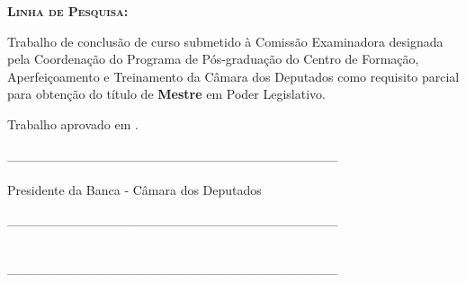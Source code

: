 \begin{folhadeaprovacao}
\begin{minipage}{15.9cm}
\textbf{\textsc{Linha de Pesquisa: }} \imprimirlinhadepesquisa


\vspace{1.2cm}

Trabalho de conclusão de curso submetido à Comissão Examinadora designada pela Coordenação do Programa de Pós-graduação do Centro de Formação, Aperfeiçoamento e Treinamento da Câmara dos Deputados como requisito parcial para obtenção do título de \textbf{Mestre} em Poder Legislativo.

\vspace{1.2cm}

Trabalho aprovado em \imprimirdataaprovacao.

\begin{flushleft}
 
\vspace{1.5cm}
\_\_\_\_\_\_\_\_\_\_\_\_\_\_\_\_\_\_\_\_\_\_\_\_\_\_\_\_\_\_\_\_\_\_\_\\
\textbf{\imprimirorientador}\\
Presidente da Banca - Câmara dos Deputados

\vspace{1.5cm}
\_\_\_\_\_\_\_\_\_\_\_\_\_\_\_\_\_\_\_\_\_\_\_\_\_\_\_\_\_\_\_\_\_\_\_\\
\textbf{\imprimirmembroA}\\
\imprimirfuncaomembroA

\vspace{1.5cm}
\_\_\_\_\_\_\_\_\_\_\_\_\_\_\_\_\_\_\_\_\_\_\_\_\_\_\_\_\_\_\_\_\_\_\_\\
\textbf{\imprimirmembroB}\\
\imprimirfuncaomembroB

\vspace{1cm}

\end{flushleft}

\end{minipage}   

\end{folhadeaprovacao}
